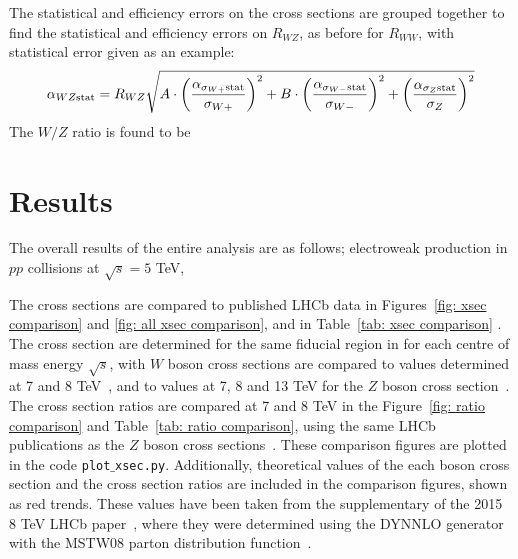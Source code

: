 \documentclass[a4paper]{article}
\begin{document}
The statistical and efficiency errors on the cross sections are grouped together to find the statistical and efficiency errors on $R_{WZ}$, as before for $R_{WW}$, with statistical error given as an example:
\begin{equation}
    \alpha_{WZ \rm stat} = R_{WZ}\sqrt{A \cdot \left(\frac{\alpha_{\sigma_{W+} \rm stat}}{\sigma_{W+}}\right)^2 + B \cdot \left(\frac{\alpha_{\sigma_{W-}\rm stat}}{\sigma_{W-}}\right)^2 + \left(\frac{\alpha_{\sigma_{Z}\rm stat}}{\sigma_Z}\right)^2}
\end{equation}
The $W/Z$ ratio is found to be



%
%
%
%

\section{Results} \label{sec: results}
The overall results of the entire analysis are as follows; electroweak production in $pp$ collisions at $\sqrt{s}=5$ TeV,








The cross sections are compared to published LHCb data in Figures~\ref{fig: xsec comparison} and \ref{fig: all xsec comparison}, and in Table~\ref{tab: xsec comparison} . The cross section are determined for the same fiducial region in for each centre of mass energy $\sqrt{s}$, with $W$ boson cross sections are compared to values determined at 7 and 8 TeV~\cite{7TeV_Z_2015,8TeV_W+Z_2015}, and to values at 7, 8 and 13 TeV for the $Z$ boson cross section~\cite{7TeV_Z_2015,8TeV_W+Z_2015,13TeV_Z_2016}.
The cross section ratios are compared at 7 and 8 TeV in the Figure~\ref{fig: ratio comparison} and Table~\ref{tab: ratio comparison}, using the same LHCb publications as the $Z$ boson cross sections~\cite{7TeV_Z_2015,8TeV_W+Z_2015}.
These comparison figures are plotted in the code \texttt{plot$\_$xsec.py}.
Additionally, theoretical values of the each boson cross section and the cross section ratios are included in the comparison figures, shown as red trends. These values have been taken from the supplementary of the 2015 8 TeV LHCb paper~\cite{8TeV_W+Z_2015}, where they were determined using the DYNNLO generator~\cite{DYNNLO} with the MSTW08 parton distribution function~\cite{MSTW08}.
\end{document}
